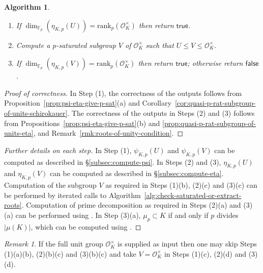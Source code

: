\documentclass[12pt, a4paper, usenames]{amsart}
\theoremstyle{plain}
\newtheorem{algorithm}[theorem]{Algorithm}
\theoremstyle{remark}
\newtheorem{remark}[theorem]{Remark}
\theoremstyle{definition}
\newcommand{\rank}{\mathrm{rank}}
\begin{document}
\begin{algorithm}
\begin{enumerate}
\begin{enumerate}
\begin{enumerate}
    such that $(p-1) \mid e_{\mathfrak{p}}$ and $\mathfrak{p}$ splits completely in 
    $K(\zeta_{p})/K$ then return \ensuremath{\mathsf{false}}.
    \end{enumerate} 
    \item If $\dim_{\mathbb{F}_{p}}(\eta_{K,p}(U)) = \rank_{p}(\mathcal{O}_{K}^{\times})$ then return \ensuremath{\mathsf{true}}.
    \item Compute a $p$-saturated subgroup $V$ of $\mathcal{O}_{K}^{\times}$ 
such that $U \leq V \leq \mathcal{O}_{K}^{\times}$.
    \item If $\dim_{\mathbb{F}_{p}}(\eta_{K,p}(V)) = \rank_{p}(\mathcal{O}_{K}^{\times})$ then return \ensuremath{\mathsf{true}};
    otherwise return \ensuremath{\mathsf{false}}.
\end{enumerate}
\end{enumerate}
\end{algorithm}

\begin{proof}[Proof of correctness]
In Step (1), the correctness of the outputs follows from 
Proposition~\ref{prop:psi-eta-give-p-sat}(a) and Corollary~\ref{cor:quasi-p-rat-subgroup-of-units-schirokauer}.
The correctness of the outputs in Steps (2) and (3) 
follows from Propositions~\ref{prop:psi-eta-give-p-sat}(b) and \ref{prop:quasi-p-rat-subgroup-of-units-eta}, and Remark~\ref{rmk:roots-of-unity-condition}.
\end{proof}

\begin{proof}[Further details on each step]
In Step (1), $\psi_{K,p}(U)$ and $\psi_{K,p}(V)$ can be computed 
as described in \S \ref{subsec:compute-psi}.
In Steps (2) and (3), $\eta_{K,p}(U)$ and $\eta_{K,p}(V)$ can be computed 
as described in \S \ref{subsec:compute-eta}.  
Computation of the subgroup $V$ as required in Steps (1)(b), (2)(c) and (3)(c)
can be performed by iterated calls to Algorithm~\ref{alg:check-saturated-or-extract-roots}.
Computation of prime decomposition as required in Steps (2)(a) and (3)(a)
can be performed using \cite[Algorithm~6.2.9]{MR1228206}.
In Step (3)(a), $\mu_{p} \subset K$ if and only if $p$ divides $|\mu(K)|$,
which can be computed using \cite[Algorithm~4.9.9]{MR1228206}.
\end{proof}

\begin{remark}\label{rmk:skip-steps-when-unit-group-known}
If the full unit group $\mathcal{O}_{K}^{\times}$ is supplied as input then one may 
skip Steps (1)(a)(b), (2)(b)(c) and (3)(b)(c) and take $V=\mathcal{O}_{K}^{\times}$ in Steps (1)(c), (2)(d) and (3)(d).
\end{remark}
\end{document}
